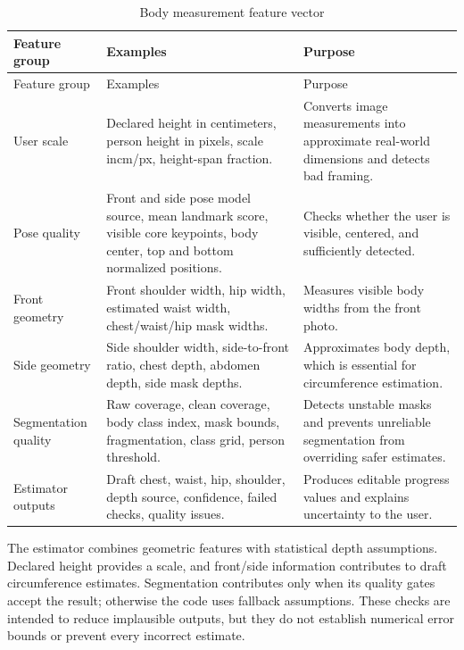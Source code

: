 \documentclass[12pt,a4paper,openany]{report}
\begin{document}
\begingroup
\footnotesize
\setlength{\tabcolsep}{3pt}
\renewcommand{\arraystretch}{1.20}
\setlength{\LTpre}{5pt}
\setlength{\LTpost}{10pt}
\begin{longtable}{|L{3.67cm}|L{5.29cm}|L{5.73cm}|}
\caption{Body measurement feature vector}\label{tab:pdf-61-27} \\
\hline
{}
Feature group & Examples & Purpose \\ \hline
\endfirsthead
\hline
{}
Feature group & Examples & Purpose \\ \hline
\endhead
User scale & Declared height in centimeters, person height in pixels, scale incm/px, height-span fraction. & Converts image measurements into approximate real-world dimensions and detects bad framing. \\ \hline
Pose quality & Front and side pose model source, mean landmark score, visible core keypoints, body center, top and bottom normalized positions. & Checks whether the user is visible, centered, and sufficiently detected. \\ \hline
Front geometry & Front shoulder width, hip width, estimated waist width, chest/waist/hip mask widths. & Measures visible body widths from the front photo. \\ \hline
Side geometry & Side shoulder width, side-to-front ratio, chest depth, abdomen depth, side mask depths. & Approximates body depth, which is essential for circumference estimation. \\ \hline
Segmentation quality & Raw coverage, clean coverage, body class index, mask bounds, fragmentation, class grid, person threshold. & Detects unstable masks and prevents unreliable segmentation from overriding safer estimates. \\ \hline
Estimator outputs & Draft chest, waist, hip, shoulder, depth source, confidence, failed checks, quality issues. & Produces editable progress values and explains uncertainty to the user. \\ \hline
\end{longtable}
\endgroup

The estimator combines geometric features with statistical depth assumptions. Declared height provides a scale, and front/side information contributes to draft circumference estimates. Segmentation contributes only when its quality gates accept the result; otherwise the code uses fallback assumptions. These checks are intended to reduce implausible outputs, but they do not establish numerical error bounds or prevent every incorrect estimate.
\end{document}
